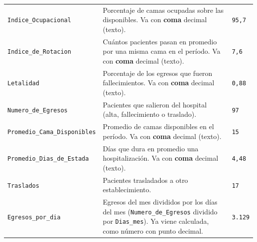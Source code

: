 \documentclass[10.5pt]{article}
\begin{document}
\begin{xltabular}{\linewidth}{@{}p{4.5cm} >{\raggedright\arraybackslash}X p{3.4cm}@{}}
\texttt{Indice\_\allowbreak{}Ocupacional} & Porcentaje de camas ocupadas sobre las disponibles. Va con \textbf{coma} decimal (texto). & \texttt{95,7} \\
\texttt{Indice\_\allowbreak{}de\_\allowbreak{}Rotacion} & Cuántos pacientes pasan en promedio por una misma cama en el período. Va con \textbf{coma} decimal (texto). & \texttt{7,6} \\
\texttt{Letalidad} & Porcentaje de los egresos que fueron fallecimientos. Va con \textbf{coma} decimal (texto). & \texttt{0,88} \\
\texttt{Numero\_\allowbreak{}de\_\allowbreak{}Egresos} & Pacientes que salieron del hospital (alta, fallecimiento o traslado). & \texttt{97} \\
\texttt{Promedio\_\allowbreak{}Cama\_\allowbreak{}Disponibles} & Promedio de camas disponibles en el período. Va con \textbf{coma} decimal (texto). & \texttt{15} \\
\texttt{Promedio\_\allowbreak{}Dias\_\allowbreak{}de\_\allowbreak{}Estada} & Días que dura en promedio una hospitalización. Va con \textbf{coma} decimal (texto). & \texttt{4,48} \\
\texttt{Traslados} & Pacientes trasladados a otro establecimiento. & \texttt{17} \\
\texttt{Egresos\_\allowbreak{}por\_\allowbreak{}dia} & Egresos del mes divididos por los días del mes (\texttt{Numero\_\allowbreak{}de\_\allowbreak{}Egresos} dividido por \texttt{Dias\_\allowbreak{}mes}). Ya viene calculada, como número con punto decimal. & \texttt{3.129} \\
\end{xltabular}
\end{document}
